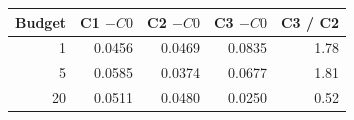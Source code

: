 \begin{tabular}{rrrrr}
\toprule
Budget & C1 $- C0$ & C2 $- C0$ & C3 $- C0$ & C3 / C2 \\
\midrule
1 & 0.0456 & 0.0469 & 0.0835 & 1.78 \\
5 & 0.0585 & 0.0374 & 0.0677 & 1.81 \\
20 & 0.0511 & 0.0480 & 0.0250 & 0.52 \\
\bottomrule
\end{tabular}
